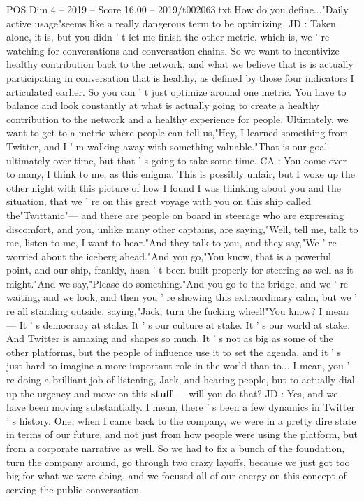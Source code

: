 \begin{textsample}{POS Dim 4 – 2019 – Score 16.00 – 2019/t002063.txt}
How do you define..."Daily active usage"seems like a really dangerous term to be optimizing.
JD : Taken alone, it is, but you didn ' t let me finish the other metric, which is, we ' re watching for conversations and conversation chains.
So we want to incentivize healthy contribution back to the network, and what we believe that is is actually participating in conversation that is healthy, as defined by those four indicators I articulated earlier.
So you can ' t just optimize around one metric.
You have to balance and look constantly at what is actually going to create a healthy contribution to the network and a healthy experience for people.
Ultimately, we want to get to a metric where people can tell us,"Hey, I learned something from Twitter, and I ' m walking away with something valuable."That is our goal ultimately over time, but that ' s going to take some time.
CA : You come over to many, I think to me, as this enigma.
This is possibly unfair, but I woke up the other night with this picture of how I found I was thinking about you and the situation, that we ' re on this great voyage with you on this ship called the"Twittanic"— and there are people on board in steerage who are expressing discomfort, and you, unlike many other captains, are saying,"Well, tell me, talk to me, listen to me, I want to hear."And they talk to you, and they say,"We ' re worried about the iceberg ahead."And you go,"You know, that is a powerful point, and our ship, frankly, hasn ' t been built properly for steering as well as it might."And we say,"Please do something."And you go to the bridge, and we ' re waiting, and we look, and then you ' re showing this extraordinary calm, but we ' re all standing outside, saying,"Jack, turn the fucking wheel!"You know?
I mean — It ' s democracy at stake.
It ' s our culture at stake.
It ' s our world at stake.
And Twitter is amazing and shapes so much.
It ' s not as big as some of the other platforms, but the people of influence use it to set the agenda, and it ' s just hard to imagine a more important role in the world than to...
I mean, you ' re doing a brilliant job of listening, Jack, and hearing people, but to actually dial up the urgency and move on this \textbf{stuff} — will you do that?
JD : Yes, and we have been moving substantially.
I mean, there ' s been a few dynamics in Twitter ' s history.
One, when I came back to the company, we were in a pretty dire state in terms of our future, and not just from how people were using the platform, but from a corporate narrative as well.
So we had to fix a bunch of the foundation, turn the company around, go through two crazy layoffs, because we just got too big for what we were doing, and we focused all of our energy on this concept of serving the public conversation.

\end{textsample}
